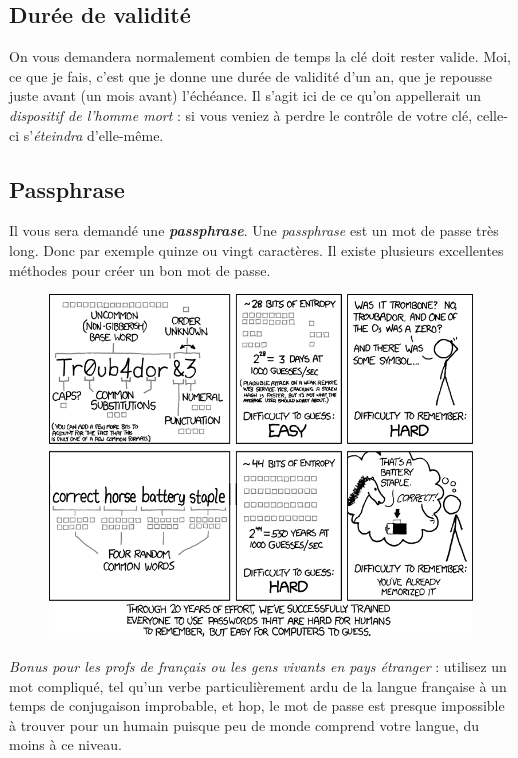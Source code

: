 \subsection{Durée de validité}\label{duruxe9e-de-validituxe9}

On vous demandera normalement combien de temps la clé doit rester
valide. Moi, ce que je fais, c'est que je donne une durée de validité d'un an,
que je repousse juste avant (un mois avant) l'échéance. Il s'agit ici
de ce qu'on appellerait un \emph{dispositif de l'homme mort} : si vous
veniez à perdre le contrôle de votre clé, celle-ci s'\emph{éteindra}
d'elle-même.

\subsection{Passphrase}\label{passphrase}

Il vous sera demandé une \textbf{\emph{passphrase}}. Une
\emph{passphrase} est un mot de passe très long. Donc par exemple quinze
ou vingt caractères. Il existe plusieurs excellentes méthodes pour créer un bon mot de passe.

\begin{figure}[h]
\centering
\includegraphics[width=\linewidth]{./images/password_strength.png}
\caption[Recommandations pour un mot de passe fort, par XKCD (\url{https://xkcd.com/936/})]{}
\end{figure}

\emph{Bonus pour les profs de français ou les gens vivants en pays
étranger} : utilisez un mot compliqué, tel qu'un verbe particulièrement
ardu de la langue française à un temps de conjugaison improbable, et
hop, le mot de passe est presque impossible à trouver pour un humain
puisque peu de monde comprend votre langue, du moins à ce niveau.


